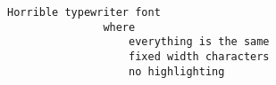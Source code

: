 \begin{verbatim}
Horrible typewriter font
               where
                   everything is the same
                   fixed width characters
                   no highlighting
\end{verbatim}